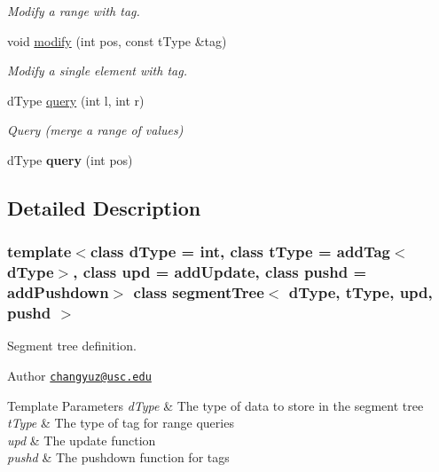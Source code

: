 \begin{DoxyCompactItemize}
\begin{DoxyCompactList}\small\item\em Modify a range with tag. \end{DoxyCompactList}\item 
void \mbox{\hyperlink{classsegment_tree_a65af68c2e74e4b76786a4b0a021969e4}{modify}} (int pos, const t\+Type \&tag)
\begin{DoxyCompactList}\small\item\em Modify a single element with tag. \end{DoxyCompactList}\item 
d\+Type \mbox{\hyperlink{classsegment_tree_aba65a5a01fbca0df3e5a0aa541ca8111}{query}} (int l, int r)
\begin{DoxyCompactList}\small\item\em Query (merge a range of values) \end{DoxyCompactList}\item 
\mbox{\label{classsegment_tree_a5fd3b63f53f60739b5244c7a1687a0e6}} 
d\+Type {\bfseries query} (int pos)
\end{DoxyCompactItemize}


\subsection{Detailed Description}
\subsubsection*{template$<$class d\+Type = int, class t\+Type = add\+Tag$<$d\+Type$>$, class upd = add\+Update, class pushd = add\+Pushdown$>$\newline
class segment\+Tree$<$ d\+Type, t\+Type, upd, pushd $>$}

Segment tree definition. 

\begin{DoxyAuthor}{Author}
\href{mailto:changyuz@usc.edu}{\tt changyuz@usc.\+edu} 
\end{DoxyAuthor}

\begin{DoxyTemplParams}{Template Parameters}
{\em d\+Type} & The type of data to store in the segment tree \\
\hline
{\em t\+Type} & The type of tag for range queries \\
\hline
{\em upd} & The update function \\
\hline
{\em pushd} & The pushdown function for tags \\
\hline
\end{DoxyTemplParams}


